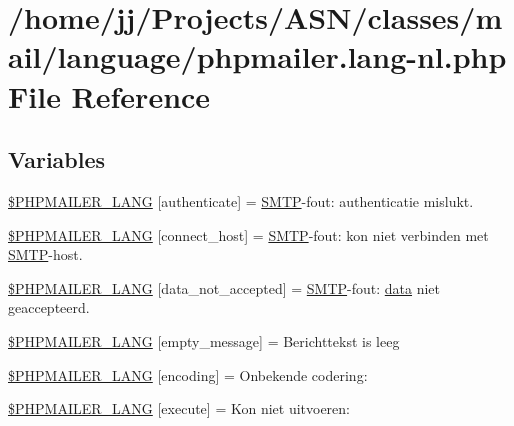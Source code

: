 \hypertarget{phpmailer_8lang-nl_8php}{}\section{/home/jj/\+Projects/\+A\+S\+N/classes/mail/language/phpmailer.lang-\/nl.php File Reference}
\label{phpmailer_8lang-nl_8php}
\subsection*{Variables}
\begin{DoxyCompactItemize}
\item 
\hyperlink{phpmailer_8lang-nl_8php_a2cb33073c989b85580748e331ed8b4aa}{\$\+P\+H\+P\+M\+A\+I\+L\+E\+R\+\_\+\+L\+A\+NG} \mbox{[}\textquotesingle{}authenticate\textquotesingle{}\mbox{]} = \textquotesingle{}\hyperlink{class_s_m_t_p}{S\+M\+TP}-\/fout\+: authenticatie mislukt.\textquotesingle{}
\item 
\hyperlink{phpmailer_8lang-nl_8php_a2ee0cc637a06b96e45600db31c6799ee}{\$\+P\+H\+P\+M\+A\+I\+L\+E\+R\+\_\+\+L\+A\+NG} \mbox{[}\textquotesingle{}connect\+\_\+host\textquotesingle{}\mbox{]} = \textquotesingle{}\hyperlink{class_s_m_t_p}{S\+M\+TP}-\/fout\+: kon niet verbinden met \hyperlink{class_s_m_t_p}{S\+M\+TP}-\/host.\textquotesingle{}
\item 
\hyperlink{phpmailer_8lang-nl_8php_a814c6b191205d2361b3233e9c9d6fda5}{\$\+P\+H\+P\+M\+A\+I\+L\+E\+R\+\_\+\+L\+A\+NG} \mbox{[}\textquotesingle{}data\+\_\+not\+\_\+accepted\textquotesingle{}\mbox{]} = \textquotesingle{}\hyperlink{class_s_m_t_p}{S\+M\+TP}-\/fout\+: \hyperlink{components_2_ossn_comments_2actions_2comment_2edit_8php_a2b67189b42ab547221cb2a6408f4746a}{data} niet geaccepteerd.\textquotesingle{}
\item 
\hyperlink{phpmailer_8lang-nl_8php_a33772099f637c9d6c2cd7425e0e37fed}{\$\+P\+H\+P\+M\+A\+I\+L\+E\+R\+\_\+\+L\+A\+NG} \mbox{[}\textquotesingle{}empty\+\_\+message\textquotesingle{}\mbox{]} = \textquotesingle{}Berichttekst is leeg\textquotesingle{}
\item 
\hyperlink{phpmailer_8lang-nl_8php_a817f7283f3d54c970a0c10305cc668cc}{\$\+P\+H\+P\+M\+A\+I\+L\+E\+R\+\_\+\+L\+A\+NG} \mbox{[}\textquotesingle{}encoding\textquotesingle{}\mbox{]} = \textquotesingle{}Onbekende codering\+: \textquotesingle{}
\item 
\hyperlink{phpmailer_8lang-nl_8php_a668217a9563a168f30f2a8548b6ed5a9}{\$\+P\+H\+P\+M\+A\+I\+L\+E\+R\+\_\+\+L\+A\+NG} \mbox{[}\textquotesingle{}execute\textquotesingle{}\mbox{]} = \textquotesingle{}Kon niet uitvoeren\+: \textquotesingle{}

\end{DoxyCompactItemize}
